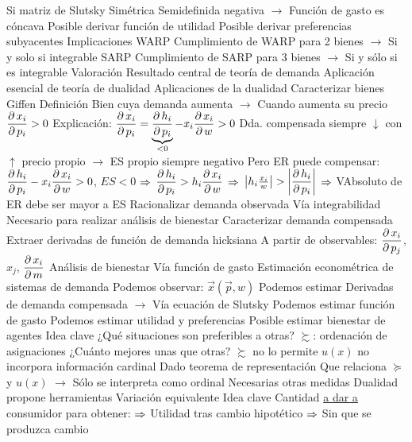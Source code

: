 \documentclass{nuevotema}
\begin{document}
\begin{esquemal}
				\4[ii] Si matriz de Slutsky
				\4[] Simétrica
				\4[] Semidefinida negativa
				\4[] $\to$ Función de gasto es cóncava
				\4[$\then$] Posible derivar función de utilidad
				\4[$\then$] Posible derivar preferencias subyacentes
			\3 Implicaciones
				\4 WARP
				\4[] Cumplimiento de WARP para 2 bienes
				\4[] $\to$ Si y solo si integrable
				\4 SARP
				\4[] Cumplimiento de SARP para 3 bienes
				\4[] $\to$ Si y sólo si es integrable
			\3 Valoración
				\4 Resultado central de teoría de demanda
				\4 Aplicación esencial de teoría de dualidad
		\2 Aplicaciones de la dualidad
			\3 Caracterizar bienes Giffen
				\4 Definición
				\4[] Bien cuya demanda aumenta
				\4[] $\to$ Cuando aumenta su precio
				\4[] $\dfrac{\partial \, x_i}{\partial \, p_i} >0$
				\4 Explicación:
				\4[] $\dfrac{\partial \, x_i}{\partial \, p_i} = \underbrace{\dfrac{\partial \, h_i}{\partial \, p_i}}_{<0} - x_i \dfrac{\partial \, x_i}{\partial \, w} > 0$
				\4[] Dda. compensada siempre $\downarrow$ con $\uparrow$ precio propio
				\4[] $\to$ ES propio siempre negativo
				\4[] Pero ER puede compensar:
				\4[] $\dfrac{\partial \, h_i}{\partial \, p_i} - x_i \dfrac{\partial \, x_i}{\partial \, w} > 0$, $ES <0$ $\then$ $\dfrac{\partial \, h_i}{\partial \, p_i} > h_i \dfrac{\partial \, x_i}{\partial \, w}$
				\4[] $\then$ $ \left| h_i \frac{x_i}{w} \right| > \left| \dfrac{\partial \, h_i}{\partial \, p_i} \right|$
				\4[] $\then$ VAbsoluto de ER debe ser mayor a ES
			\3 Racionalizar demanda observada
				\4 Vía integrabilidad
				\4 Necesario para realizar análisis de bienestar
			\3 Caracterizar demanda compensada
				\4 Extraer derivadas de función de demanda hicksiana
				\4 A partir de observables: $\dfrac{\partial \, x_i}{\partial \, p_j}$, $x_j$, $\dfrac{\partial \, x_i}{\partial \, m}$
			\3 Análisis de bienestar
				\4 Vía función de gasto
			\3 Estimación econométrica de sistemas de demanda
				\4 Podemos observar:
				\4[] $\vec{x}(\vec{p},w)$
				\4 Podemos estimar
				\4[] Derivadas de demanda compensada
				\4[] $\to$ Vía ecuación de Slutsky
				\4[$\then$] Podemos estimar función de gasto
				\4[$\then$] Podemos estimar utilidad y preferencias
				\4[$\then$] Posible estimar bienestar de agentes
	\1 
		\2 Idea clave
			\3 ¿Qué situaciones son preferibles a otras?
				\4 $\succsim$: ordenación de asignaciones
			\3 ¿Cuánto mejores unas que otras?
				\4 $\succsim$ no lo permite
				\4 $u(x)$ no incorpora información cardinal
				\4[] Dado teorema de representación
				\4[] Que relaciona $\succeq$ y $u(x)$
				\4[] $\to$ Sólo se interpreta como ordinal
				\4 Necesarias otras medidas
				\4 Dualidad propone herramientas
		\2 Variación equivalente
			\3 Idea clave
				\4 Cantidad \underline{a dar a} consumidor para obtener:
				\4[] $\then$ Utilidad tras cambio hipotético
				\4[] $\then$ Sin que se produzca cambio

\end{esquemal}
\end{document}
